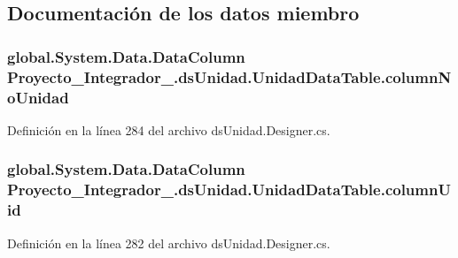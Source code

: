 \subsection{Documentación de los datos miembro}
\hypertarget{class_proyecto___integrador__3_1_1ds_unidad_1_1_unidad_data_table_a76dea428dada0e0bc3dd85d44defca54}{
\subsubsection[{column\-No\-Unidad}]{\setlength{\rightskip}{0pt plus 5cm}global.\-System.\-Data.\-Data\-Column Proyecto\-\_\-\-Integrador\-\_.\-ds\-Unidad.\-Unidad\-Data\-Table.\-column\-No\-Unidad\hspace{0.3cm}{\ttfamily [private]}}}\label{class_proyecto___integrador__3_1_1ds_unidad_1_1_unidad_data_table_a76dea428dada0e0bc3dd85d44defca54}


Definición en la línea 284 del archivo ds\-Unidad.\-Designer.\-cs.

\hypertarget{class_proyecto___integrador__3_1_1ds_unidad_1_1_unidad_data_table_aefd081eba99db8c2b29c1fa2f4c32245}{
\subsubsection[{column\-Uid}]{\setlength{\rightskip}{0pt plus 5cm}global.\-System.\-Data.\-Data\-Column Proyecto\-\_\-\-Integrador\-\_.\-ds\-Unidad.\-Unidad\-Data\-Table.\-column\-Uid\hspace{0.3cm}{\ttfamily [private]}}}\label{class_proyecto___integrador__3_1_1ds_unidad_1_1_unidad_data_table_aefd081eba99db8c2b29c1fa2f4c32245}


Definición en la línea 282 del archivo ds\-Unidad.\-Designer.\-cs.



